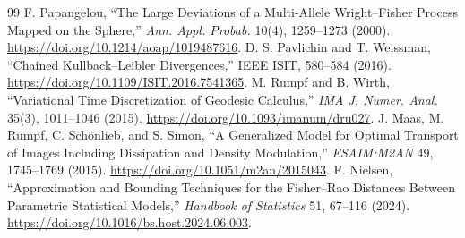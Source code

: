 \documentclass[10pt,a4paper]{article}
\begin{document}
\begin{thebibliography}{99}
 F. Papangelou, ``The Large Deviations of a Multi-Allele Wright--Fisher Process Mapped on the Sphere,'' \emph{Ann. Appl. Probab.} 10(4), 1259--1273 (2000). \url{https://doi.org/10.1214/aoap/1019487616}.
 D. S. Pavlichin and T. Weissman, ``Chained Kullback--Leibler Divergences,'' IEEE ISIT, 580--584 (2016). \url{https://doi.org/10.1109/ISIT.2016.7541365}.
 M. Rumpf and B. Wirth, ``Variational Time Discretization of Geodesic Calculus,'' \emph{IMA J. Numer. Anal.} 35(3), 1011--1046 (2015). \url{https://doi.org/10.1093/imanum/dru027}.
 J. Maas, M. Rumpf, C. Sch\"onlieb, and S. Simon, ``A Generalized Model for Optimal Transport of Images Including Dissipation and Density Modulation,'' \emph{ESAIM:M2AN} 49, 1745--1769 (2015). \url{https://doi.org/10.1051/m2an/2015043}.
 F. Nielsen, ``Approximation and Bounding Techniques for the Fisher--Rao Distances Between Parametric Statistical Models,'' \emph{Handbook of Statistics} 51, 67--116 (2024). \url{https://doi.org/10.1016/bs.host.2024.06.003}.
\end{thebibliography}
\end{document}
